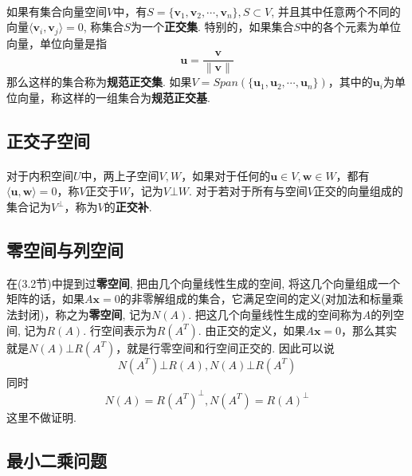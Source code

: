 \paragraph{}
如果有集合向量空间$V$中，有$S = \{\textbf{v}_1, \textbf{v}_2, \cdots, \textbf{v}_n\}, S \subset V$, 并且其中任意两个不同的向量$\langle \textbf{v}_i, \textbf{v}_j \rangle = 0$, 称集合$S$为一个\textbf{正交集}. 特别的，如果集合$S$中的各个元素为单位向量，单位向量是指
$$
\textbf{u} = \frac{\textbf{v}}{\parallel \textbf{v} \parallel}
$$
那么这样的集合称为\textbf{规范正交集}. 如果$V = Span(\{\textbf{u}_1, \textbf{u}_2, \cdots, \textbf{u}_n\})$，其中的$\textbf{u}_i$为单位向量，称这样的一组集合为\textbf{规范正交基}.

\subsection{正交子空间}
\paragraph{}
对于内积空间$U$中，两上子空间$V, W$，如果对于任何的$\textbf{u} \in V, \textbf{w} \in W$，都有$\langle \textbf{u}, \textbf{w} \rangle = 0$，称$V$正交于$W$，记为$V\bot W$.  对于若对于所有与空间$V$正交的向量组成的集合记为$V^\bot$，称为$V$的\textbf{正交补}.

\subsection{零空间与列空间}
在(3.2节)中提到过\textbf{零空间}, 把由几个向量线性生成的空间, 将这几个向量组成一个矩阵的话，如果$A\textbf{x} = 0$的非零解组成的集合，它满足空间的定义(对加法和标量乘法封闭)，称之为\textbf{零空间}, 记为$N(A)$.  把这几个向量线性生成的空间称为$A$的列空间, 记为$R(A)$. 行空间表示为$R(A^T)$. 由正交的定义，如果$A\textbf{x} = 0$，那么其实就是$N(A) \bot R(A^T)$，就是行零空间和行空间正交的.  因此可以说
$$
N(A^T)\bot R(A), N(A)\bot R(A^T)
$$
同时
$$
N(A) = R(A^T)^\bot, N(A^T) = R(A)^\bot
$$
这里不做证明.

\subsection{最小二乘问题}
